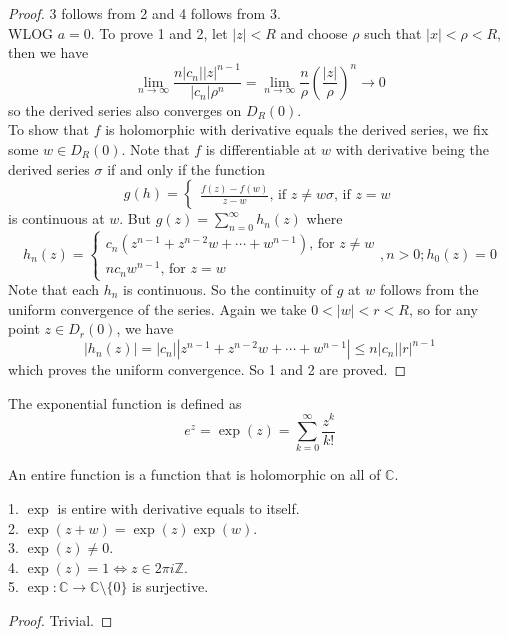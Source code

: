 \begin{proof}
    3 follows from 2 and 4 follows from 3.\\
    WLOG $a=0$.
    To prove 1 and 2, let $|z|<R$ and choose $\rho$ such that $|x|<\rho<R$, then we have
    $$\lim_{n\to\infty}\frac{n|c_n||z|^{n-1}}{|c_n|\rho^n}=\lim_{n\to\infty}\frac{n}{\rho}\left( \frac{|z|}{\rho} \right)^n\to 0$$
    so the derived series also converges on $D_R(0)$.\\
    To show that $f$ is holomorphic with derivative equals the derived series, we fix some $w\in D_R(0)$.
    Note that $f$ is differentiable at $w$ with derivative being the derived series $\sigma$ if and only if the function
    $$g(h)=
    \begin{cases}
        \frac{f(z)-f(w)}{z-w}\text{, if $z\neq w$}
        \sigma\text{, if $z=w$}
    \end{cases}$$
    is continuous at $w$.
    But $g(z)=\sum_{n=0}^\infty h_n(z)$ where
    $$h_n(z)=\begin{cases}
        c_n(z^{n-1}+z^{n-2}w+\cdots+w^{n-1})\text{, for $z\neq w$}\\
        nc_nw^{n-1}\text{, for $z=w$}
    \end{cases},n>0;h_0(z)=0$$
    Note that each $h_n$ is continuous.
    So the continuity of $g$ at $w$ follows from the uniform convergence of the series.
    Again we take $0<|w|<r<R$, so for any point $z\in D_r(0)$, we have
    $$|h_n(z)|=|c_n||z^{n-1}+z^{n-2}w+\cdots+w^{n-1}|\le n|c_n||r|^{n-1}$$
    which proves the uniform convergence.
    So 1 and 2 are proved.
\end{proof}
\begin{definition}
    The exponential function is defined as
    $$e^z=\exp(z)=\sum_{k=0}^\infty\frac{z^k}{k!}$$
\end{definition}
\begin{definition}
    An entire function is a function that is holomorphic on all of $\mathbb C$.
\end{definition}
\begin{proposition}
    1. $\exp$ is entire with derivative equals to itself.\\
    2. $\exp(z+w)=\exp(z)\exp(w)$.\\
    3. $\exp(z)\neq 0$.\\
    4. $\exp(z)=1\iff z\in2\pi i\mathbb Z$.\\
    5. $\exp:\mathbb C\to\mathbb C\setminus\{0\}$ is surjective.
\end{proposition}
\begin{proof}
    Trivial.
\end{proof}
